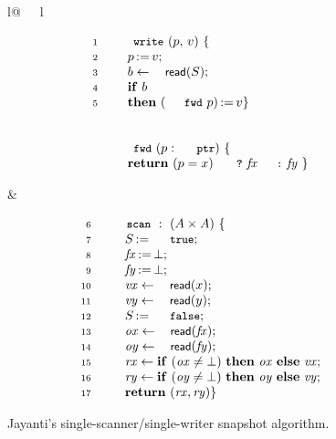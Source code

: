 
\newcommand{\fwdp}[1]{(\esc{fwd}~#1)}
\newcommand{\aleksfwdp}[1]{\esc{fwd}~#1}

\begin{figure}[t]
%
\centering
\begin{tabular}[t]{l@{\ \ \ }l}
%  
\begin{minipage}[t]{.4\textwidth}
\[
\begin{array}{rl}
\num{1}~ & \esc{write}\ (p,\, v)\ \{ \\ 
\num{2}~ & ~~~ \actwrite{p}{v}; \\
\num{3}~ & ~~~ b \tbnd \act{read}(\s);\\
\num{4}~ & ~~~ \kw{if}\ b\\
\num{5}~ & ~~~ \kw{then}\ \actwrite{\fwdp{p}}{v}\}\\
& \\
& \\
& \esc{fwd}\ (p : \esc{ptr})\ \{ \\
& ~~~ \kw{return}\ (p = x)\ \esc{?}\ \fx \esc{:}\ \fy\ \}
\end{array}
\]
\end{minipage}
%
&
\begin{minipage}[t]{.6\textwidth}
\[
\begin{array}{rl}
\num{6}~  & \esc{scan}\ :\ (A \times A)\ \{\\ 
\num{7}~  & ~~~~ \actwrite{\s}{\esc{true}};\\
\num{8}~  & ~~~~ \actwrite{\fx}{\bot};\\
\num{9}~  & ~~~~ \actwrite{\fy}{\bot}; \\
\num{10}~ & ~~~~ \var{vx} \tbnd \act{read}(\x);\\
\num{11}~ & ~~~~ \var{vy} \tbnd \act{read}(\y);\\
\num{12}~ & ~~~~ \actwrite{\s}{\esc{false}};\\
\num{13}~ & ~~~~ \var{ox} \tbnd \act{read}(\fx);\\
\num{14}~ & ~~~~ \var{oy} \tbnd \act{read}(\fy);\\
\num{15}~ & ~~~~ \var{rx} \tbnd \kw{if}\ (\var{ox} \neq\bot)\ \kw{then}\ \var{ox}\
                          \kw{else}\ \var{vx};\\  
\num{16}~ & ~~~~ \var{ry} \tbnd \kw{if}\ (\var{oy} \neq\bot)\ \kw{then}\ \var{oy}\
                          \kw{else}\ \var{vy};\\  
\num{17}~ & ~~~~ \kw{return}~(\var{rx},\var{ry})\}\\
\end{array}
\]
\end{minipage}
%
\end{tabular}
%
\caption{Jayanti's single-scanner/single-writer snapshot algorithm.}
\label{fig:jayanti-snapshot}
\end{figure}

